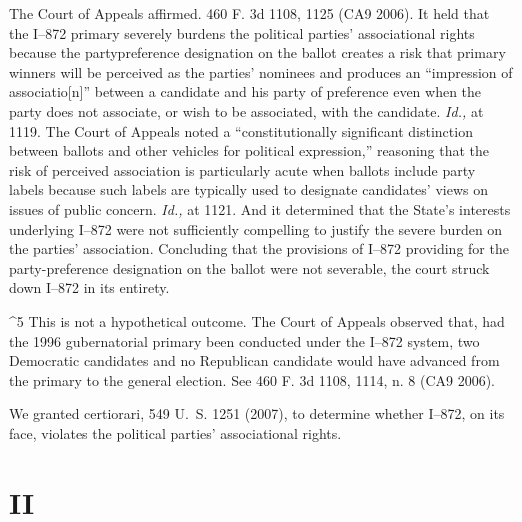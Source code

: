   The Court of Appeals affirmed. 460 F. 3d 1108, 1125 (CA9 2006). It
held that the I--872 primary severely burdens the political parties'
associational rights because the partypreference designation on the
ballot creates a risk that primary winners will be perceived as the
parties' nominees and produces an ``impression of associatio[n]''
between a candidate and his party of preference even when the party does
not associate, or wish to be associated, with the candidate. \emph{Id.,}
at 1119. The Court of Appeals noted a ``constitutionally \newpage 
significant distinction between ballots and other vehicles for political
expression,'' reasoning that the risk of perceived association is
particularly acute when ballots include party labels because such labels
are typically used to designate candidates' views on issues of public
concern. \emph{Id.,} at 1121. And it determined that the State's
interests underlying I--872 were not sufficiently compelling to justify
the severe burden on the parties' association. Concluding that the
provisions of I--872 providing for the party-preference designation
on the ballot were not severable, the court struck down I--872 in its
entirety.

^5 This is not a hypothetical outcome. The Court of Appeals observed
that, had the 1996 gubernatorial primary been conducted under the
I--872 system, two Democratic candidates and no Republican candidate
would have advanced from the primary to the general election. See 460
F. 3d 1108, 1114, n. 8 (CA9 2006).

  We granted certiorari, 549 U.~S. 1251 (2007), to determine
whether I--872, on its face, violates the political parties'
associational rights.

\section{II}


